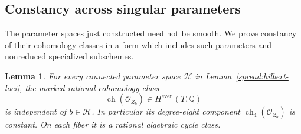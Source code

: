 \documentclass[11pt]{article}
\newtheorem{lemma}[theorem]{Lemma}
\theoremstyle{definition}
\theoremstyle{remark}
\numberwithin{equation}{section}
\begin{document}
\subsection{Constancy across singular parameters}

The parameter spaces just constructed need not be smooth.  We prove
constancy of their cohomology classes in a form which includes such
parameters and nonreduced specialized subschemes.

\begin{lemma}
\label{spread:chern-constancy}
For every connected parameter space $\mathcal H$ in
Lemma~\ref{spread:hilbert-loci}, the marked rational cohomology class
\[
 \operatorname{ch}(\mathcal O_{Z_b})\in H^{\mathrm{even}}(T,\mathbb Q)
\]
is independent of $b\in\mathcal H$.  In particular its degree-eight
component $\operatorname{ch}_4(\mathcal O_{Z_b})$ is constant.  On each fiber it is
a rational algebraic cycle class.
\end{lemma}
\end{document}
